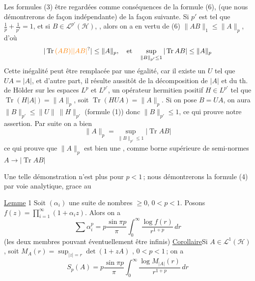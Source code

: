 Les formules (3)   être regardées  comme
conséquences de la formule (6), (que nous démontrerons de façon indépendante) de la façon
suivante. Si $p'$ est tel que $\frac{1}{p}+\frac{1}{p'}=1$,
et si $B\in\mathcal L^{p'}(\mathcal H)$, 
, alors
on a en vertu de (6) $\|AB\|_1\leq\|A\|_p$, d'où
\[
|\operatorname{Tr}\unsure{(AB)|\lvert AB\rvert}|\leq\|A\|_p,\quad\text{et}\quad
\sup_{\|B\|_{p'}\leq1}|\operatorname{Tr}AB|\leq\|A\|_p
\]
Cette inégalité peut être remplacée par une égalité,
car il existe un    $U$ tel que
$UA=|A|$,  et d'autre part,  il
résulte aussitôt de la décomposition  de
$|A|$ et du th. de Hölder  sur les
espaces $L^p$ et $L^{p'}$, un opérateur hermitien
positif $H\in L^{p'}$ tel que $\operatorname{Tr}(H|A|)=\|A\|_p$,
soit \deleted{\unsure{$|$}}$\operatorname{Tr}(HUA)$\deleted{\unsure{$|$}}$=\|A\|_p$. Si on pose
$B=UA$, on aura $\|B\|_{p'}\leq\|U\|\ \|H\|_{p'}$ (formule
(1)) donc $\|B\|_{p'}\leq1$, ce qui prouve notre assertion.
Par suite on a bien
\[
\|A\|_p=\sup_{\|B\|_{p'}\leq1}|\operatorname{Tr}AB|\tag*{(7)}
\]
ce qui prouve que $\|A\|_p$ est bien une
, comme borne supérieure de
semi-normes $A\to|\operatorname{Tr}AB|$

Une telle démonstration n'est plus 
pour $p<1$\,;  nous démontrerons la formule (4)
par voie analytique, grace au

\uline{Lemme} 1 \quad Soit $(\alpha_i)$ une suite   de
nombres $\geq0$, 
  $0<p<1$. Posons $f(z)=\prod_{i=1}^{\infty}(1+\alpha_i z)$.
Alors on a
\[
\sum\alpha_i^p=p\frac{\sin\pi p}{\pi}\int_0^\infty\frac{\log f(r)}{r^{1+p}}\,dr\tag*{(8)}
\]
(les deux membres pouvant éventuellement
être infinis)
\uline{Corollaire}\quad Si $A\in\mathcal L^1(\mathcal H)$, soit
$M_A(r)=\sup_{|z|=r}\det(1+zA)$
, 
  $0<p<1$\,; on a
\[
S_p(A)=p\frac{\sin\pi p}{\pi}\int_0^\infty\frac{\log M_{|A|}(r)}{r^{1+p}}\,dr\tag*{(9)}
\]

